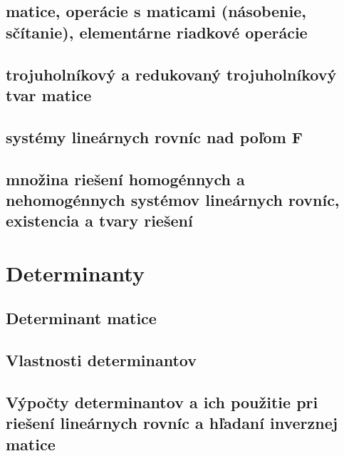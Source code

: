\subsection*{matice, operácie s maticami (násobenie, sčítanie), elementárne riadkové operácie}
\subsection*{trojuholníkový a redukovaný trojuholníkový tvar matice}
\subsection*{systémy lineárnych rovníc nad poľom F}
\subsection*{množina riešení homogénnych a nehomogénnych systémov lineárnych rovníc, existencia a tvary riešení}

\section{Determinanty}
\subsection*{Determinant matice}
\subsection*{Vlastnosti determinantov}
\subsection*{Výpočty determinantov a ich použitie pri riešení lineárnych rovníc a hľadaní inverznej matice}

